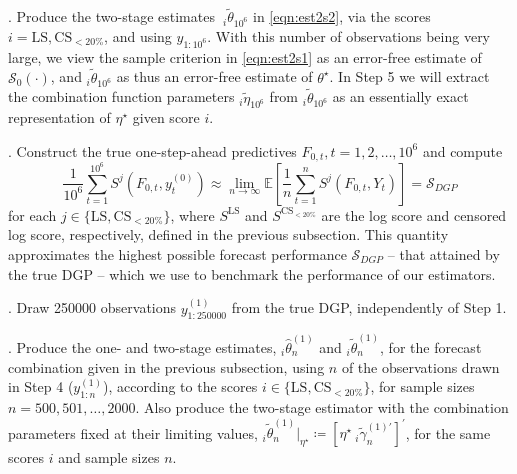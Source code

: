 \documentclass[12pt]{article}
\theoremstyle{definition}
\theoremstyle{remark}
\begin{document}
\medskip

. Produce the two-stage estimates\textbf{\ }${}_{i}\tilde{\theta}_{10^{6}}$ in \eqref{eqn:est2s2}, via the scores $i=\mathrm{LS},\mathrm{CS}_{<20\%}$, and using $y_{1:10^{6}}$. With this number of observations being very large, we view the sample criterion in \eqref{eqn:est2s1} as an error-free estimate of $\mathcal{S}_{0}(\cdot )$, and ${}_{i}\tilde{\theta}_{10^{6}}$ as thus an error-free estimate of $\theta ^{\star }$. In Step 5 we will extract the combination function parameters ${}_{i}\tilde{\eta}_{10^{6}}$ from ${}_{i}\tilde{\theta}_{10^{6}}$ as an essentially exact representation of $\eta ^{\star }$ given score $i$.

\medskip

. Construct the true one-step-ahead predictives $F_{0,t}, t = 1, 2, \ldots, 10^6$ and compute 
\begin{equation}
\frac{1}{10^6} \sum_{t = 1}^{10^6} S^j(F_{0,t}, y^{(0)}_t) \approx \lim_{n \to \infty} \mathbb{E} \left[ \frac{1}{n} \sum_{t=1}^n S^j(F_{0,t}, Y_t) \right] = \mathcal{S}_{DGP}  \label{eqn:sdgp}
\end{equation}
for each $j \in \{\mathrm{LS}, \mathrm{CS}_{<20\%}\}$, where $S^{\mathrm{LS}} $ and $S^{\mathrm{CS}_{<20\%}}$ are the log score and censored log score, respectively, defined in the previous subsection. This quantity approximates the highest possible forecast performance $\mathcal{S}_{DGP}$ -- that attained by the true DGP -- which we use to benchmark the performance of our estimators.

\medskip

. Draw 250000 observations $y^{(1)}_{1:250000}$ from the true DGP, independently of Step 1.

\medskip

. Produce the one- and two-stage estimates, ${}_{i}\hat{\theta}_{n}^{(1)}$ and ${}_{i}\tilde{\theta}_{n}^{(1)}$, for the forecast combination given in the previous subsection, using $n$ of the observations drawn in Step 4 ($y_{1:n}^{(1)}$), according to the scores $i\in \{\mathrm{LS},\mathrm{CS}_{<20\%}\}$, for sample sizes $n=500,501,\ldots ,2000$. Also produce the two-stage estimator with the combination parameters fixed at their limiting values, ${}_{i}\tilde{\theta}_{n}^{(1)}|_{\eta ^{\star }} \coloneqq [ \eta ^{\star}\ {}_{i}\tilde{\gamma}_{n}^{(1)\prime} ]^{\prime}$, for the same scores $i$ and sample sizes $n$.

\medskip
\end{document}
